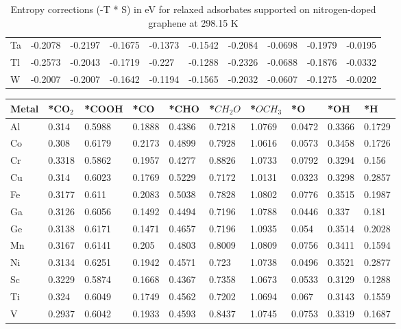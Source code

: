 \begin{table}[h]
{\begin{tabular}{*{10}{l}}
      Ta & -0.2078 & -0.2197 & -0.1675 & -0.1373 & -0.1542 & -0.2084 & -0.0698 & -0.1979 & -0.0195 \\
      Tl & -0.2573 & -0.2043 & -0.1719 & -0.227  & -0.1288 & -0.2326 & -0.0688 & -0.1876 & -0.0332 \\
      W  & -0.2007 & -0.2007 & -0.1642 & -0.1194 & -0.1565 & -0.2032 & -0.0607 & -0.1275 & -0.0202 \\
      \hline
  \end{tabular}
  }
  \caption{Entropy corrections (-T * S) in eV for relaxed adsorbates supported on nitrogen-doped graphene at 298.15 K}
  \label{si_table10}
\end{table}


\begin{table}[h]
  \centering
  {\fontsize{6}{12}\selectfont
  \begin{tabular}{*{10}{l}}
      \hline
      Metal & *CO$_2$ & *COOH & *CO & *CHO & *$CH_2O$ & *$OCH_3$ & *O & *OH & *H          \\
      \hline
      Al & 0.314  & 0.5988 & 0.1888 & 0.4386 & 0.7218 & 1.0769 & 0.0472 & 0.3366 & 0.1729 \\
      Co & 0.308  & 0.6179 & 0.2173 & 0.4899 & 0.7928 & 1.0616 & 0.0573 & 0.3458 & 0.1726 \\
      Cr & 0.3318 & 0.5862 & 0.1957 & 0.4277 & 0.8826 & 1.0733 & 0.0792 & 0.3294 & 0.156  \\
      Cu & 0.314  & 0.6023 & 0.1769 & 0.5229 & 0.7172 & 1.0131 & 0.0323 & 0.3298 & 0.2857 \\
      Fe & 0.3177 & 0.611  & 0.2083 & 0.5038 & 0.7828 & 1.0802 & 0.0776 & 0.3515 & 0.1987 \\
      Ga & 0.3126 & 0.6056 & 0.1492 & 0.4494 & 0.7196 & 1.0788 & 0.0446 & 0.337  & 0.181  \\
      Ge & 0.3138 & 0.6171 & 0.1471 & 0.4657 & 0.7196 & 1.0935 & 0.054  & 0.3514 & 0.2028 \\
      Mn & 0.3167 & 0.6141 & 0.205  & 0.4803 & 0.8009 & 1.0809 & 0.0756 & 0.3411 & 0.1594 \\
      Ni & 0.3134 & 0.6251 & 0.1942 & 0.4571 & 0.723  & 1.0738 & 0.0496 & 0.3521 & 0.2877 \\
      Sc & 0.3229 & 0.5874 & 0.1668 & 0.4367 & 0.7358 & 1.0673 & 0.0533 & 0.3129 & 0.1288 \\
      Ti & 0.324  & 0.6049 & 0.1749 & 0.4562 & 0.7202 & 1.0694 & 0.067  & 0.3143 & 0.1559 \\
      V  & 0.2937 & 0.6042 & 0.1933 & 0.4593 & 0.8437 & 1.0745 & 0.0753 & 0.3319 & 0.1687 \\

\end{tabular}}
\end{table}
